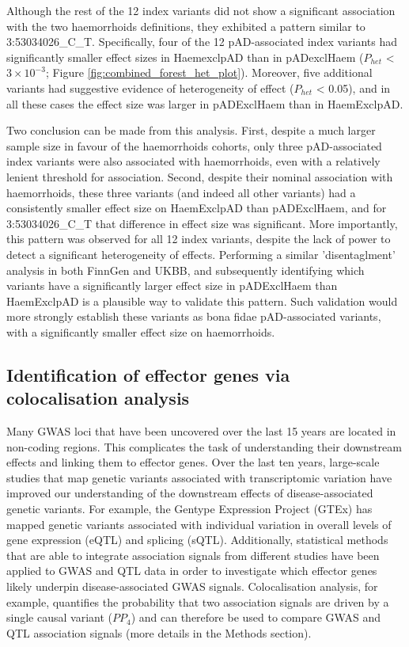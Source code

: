 Although the rest of the 12 index variants did not show a significant association with the two haemorrhoids definitions, they exhibited a pattern similar to 3:53034026\_C\_T. Specifically, four of the 12 pAD-associated index variants had significantly smaller effect sizes in HaemexclpAD than in pADexclHaem ($P_{het}$ < $3\times10^{-3}$; Figure \ref{fig:combined_forest_het_plot}). Moreover, five additional variants had suggestive evidence of heterogeneity of effect ($P_{het}$ < 0.05), and in all these cases the effect size was larger in pADExclHaem than in HaemExclpAD. 

Two conclusion can be made from this analysis. First, despite a much larger sample size in favour of the haemorrhoids cohorts, only three pAD-associated index variants were also associated with haemorrhoids, even with a relatively lenient threshold for association. Second, despite their nominal association with haemorrhoids, these three variants (and indeed all other variants) had a consistently smaller effect size on HaemExclpAD than pADExclHaem, and for 3:53034026\_C\_T that difference in effect size was significant. More importantly, this pattern was observed for all 12 index variants, despite the lack of power to detect a significant heterogeneity of effects. Performing a similar 'disentaglment' analysis in both FinnGen and UKBB, and subsequently identifying which variants have a significantly larger effect size in pADExclHaem than HaemExclpAD is a plausible way to validate this pattern. Such validation would more strongly establish these variants as bona fidae pAD-associated variants, with a significantly smaller effect size on haemorrhoids.\\



\subsection{Identification of effector genes via colocalisation analysis} \label{sec:coloc}
Many GWAS loci that have been uncovered over the last 15 years are located in non-coding regions. This complicates the task of understanding their downstream effects and linking them to effector genes. Over the last ten years, large-scale studies that map genetic variants associated with transcriptomic variation have improved our understanding of the downstream effects of disease-associated genetic variants. For example, the Gentype Expression Project (GTEx) has mapped genetic variants associated with individual variation in overall levels of gene expression (eQTL) and splicing (sQTL). Additionally, statistical methods that are able to integrate association signals from different studies have been applied to GWAS and QTL data in order to investigate which effector genes likely underpin disease-associated GWAS signals. Colocalisation analysis, for example, quantifies the probability that two association signals are driven by a single causal variant ($PP_{4}$) and can therefore be used to compare GWAS and QTL association signals (more details in the Methods section).\\


